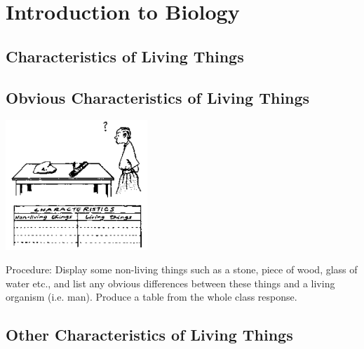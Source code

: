 \section{Introduction to Biology}

\begin{multicols}{2}


\section*{Characteristics of Living Things}


\subsection{Obvious Characteristics of Living Things} %

\begin{center}
\includegraphics[width=0.4\textwidth]{./img/source/obv-char-living.png}
\end{center}

\begin{description*}
\item[Procedure:]{Display some non-living things such as a stone, piece of wood, glass of water etc., and list
any obvious differences between these things and a living organism (i.e. man). Produce a
table from the whole class response.}
\end{description*}

\subsection{Other Characteristics of Living Things} %


\end{multicols}
